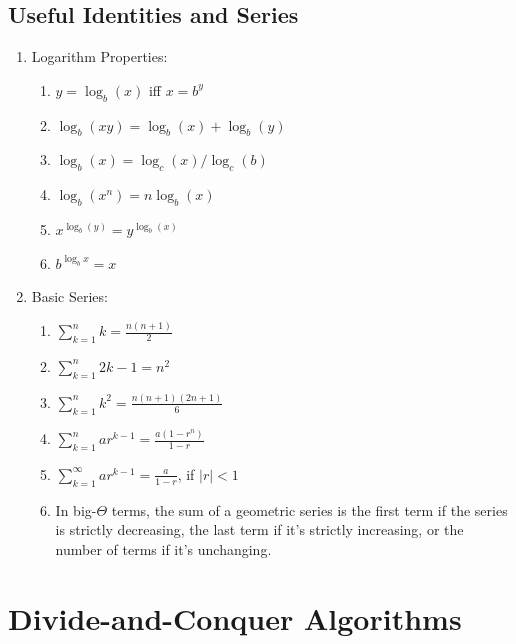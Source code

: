 \documentclass[10pt]{article}
\begin{document}
\begin{multicols}{2}
\begin{addmargin}[0.8em]{0.5em}
    \subsection{Useful Identities and Series}
    \begin{enumerate}[label=(\alph*)]
        \item Logarithm Properties:
        \begin{enumerate}[label=(\roman*)]
            \item $y = \log_b(x)$ iff $x = b^y$
            \item $\log_b(xy) = \log_b(x) + \log_b(y)$
            \item $\log_b(x) = \log_c(x) / \log_c(b)$
            \item $\log_b(x^n) = n\log_b(x)$
            \item $x^{\log_b(y)} = y^{\log_b(x)}$
            \item $b^{\log_b{x}} = x$
        \end{enumerate}
        \item Basic Series:
        \begin{enumerate}
            \item $\sum_{k=1}^{n} k = \frac{n(n+1)}{2}$
            \item $\sum_{k=1}^{n} 2k - 1 = n^2$
            \item $\sum_{k=1}^{n} k^2 = \frac{n(n+1)(2n+1)}{6}$
            \item $\sum_{k=1}^{n} a r^{k-1} = \frac{a(1-r^n)}{1-r}$
            \item $\sum_{k=1}^{\infty} a r^{k-1} = \frac{a}{1-r}$, if  $|r| < 1$
            \item In big-$\Theta$ terms, the sum of a geometric series is the first term if the series is strictly decreasing, the last term if it's strictly increasing, or the number of terms if it's unchanging.
        \end{enumerate}
        
    \end{enumerate} 
\end{addmargin}

\section{Divide-and-Conquer Algorithms}
\begin{addmargin}[0.8em]{0.5em}

\end{addmargin}
\end{multicols}
\end{document}
